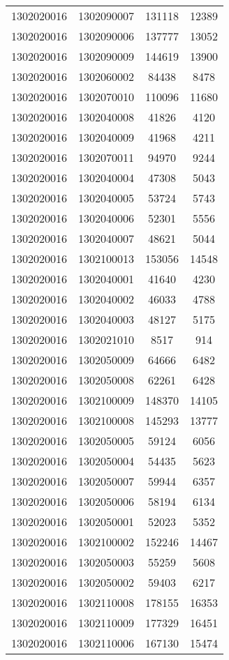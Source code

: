\begin{longtable}[h]{llcc}
		1302020016 & 1302090007 & 131118 & 12389\\
		1302020016 & 1302090006 & 137777 & 13052\\
		1302020016 & 1302090009 & 144619 & 13900\\
		1302020016 & 1302060002 & 84438 & 8478\\
		1302020016 & 1302070010 & 110096 & 11680\\
		1302020016 & 1302040008 & 41826 & 4120\\
		1302020016 & 1302040009 & 41968 & 4211\\
		1302020016 & 1302070011 & 94970 & 9244\\
		1302020016 & 1302040004 & 47308 & 5043\\
		1302020016 & 1302040005 & 53724 & 5743\\
		1302020016 & 1302040006 & 52301 & 5556\\
		1302020016 & 1302040007 & 48621 & 5044\\
		1302020016 & 1302100013 & 153056 & 14548\\
		1302020016 & 1302040001 & 41640 & 4230\\
		1302020016 & 1302040002 & 46033 & 4788\\
		1302020016 & 1302040003 & 48127 & 5175\\
		1302020016 & 1302021010 & 8517 & 914\\
		1302020016 & 1302050009 & 64666 & 6482\\
		1302020016 & 1302050008 & 62261 & 6428\\
		1302020016 & 1302100009 & 148370 & 14105\\
		1302020016 & 1302100008 & 145293 & 13777\\
		1302020016 & 1302050005 & 59124 & 6056\\
		1302020016 & 1302050004 & 54435 & 5623\\
		1302020016 & 1302050007 & 59944 & 6357\\
		1302020016 & 1302050006 & 58194 & 6134\\
		1302020016 & 1302050001 & 52023 & 5352\\
		1302020016 & 1302100002 & 152246 & 14467\\
		1302020016 & 1302050003 & 55259 & 5608\\
		1302020016 & 1302050002 & 59403 & 6217\\
		1302020016 & 1302110008 & 178155 & 16353\\
		1302020016 & 1302110009 & 177329 & 16451\\
		1302020016 & 1302110006 & 167130 & 15474\\

\end{longtable}
